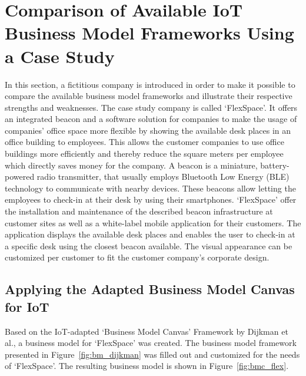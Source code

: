 \section{Comparison of Available IoT Business Model Frameworks Using a Case Study}
\label{sec:bmf_comparison}
\vspace{-1em}
	In this section, a fictitious company is introduced in order to make it possible to compare the available business model frameworks and illustrate their respective strengths and weaknesses.
	The case study company is called `FlexSpace'. It offers an integrated beacon and a software solution for companies to make the usage of companies' office space more flexible by showing the available desk places in an office building to employees. This allows the customer companies to use office buildings more efficiently and thereby reduce the square meters per employee which directly saves money for the company. A beacon is a miniature, battery-powered radio transmitter, that usually employs  Bluetooth Low Energy (BLE) technology to communicate with nearby devices. These beacons allow letting the employees to check-in at their desk by using their smartphones. `FlexSpace' offer the installation and maintenance of the described beacon infrastructure at customer sites as well as a white-label mobile application for their customers. The application displays the available desk places and enables the user to check-in at a specific desk using the closest beacon available. The visual appearance can be customized per customer to fit the customer company's corporate design.
	\vspace{-1em}
	\subsection{Applying the Adapted Business Model Canvas for IoT}
	\vspace{-1em}
		Based on the IoT-adapted `Business Model Canvas' Framework by Dijkman et al., a business model for `FlexSpace' was created. The business model framework presented in Figure~\ref{fig:bm_dijkman} was filled out and customized for the needs of `FlexSpace'. The resulting business model is shown in Figure~\ref{fig:bmc_flex}.

	

